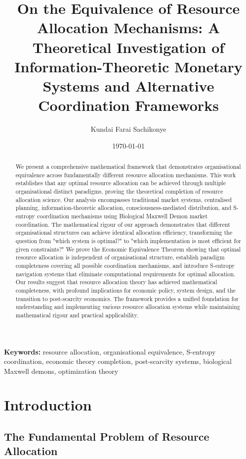 \documentclass[12pt,a4paper]{article}
\title{\textbf{On the Equivalence of Resource Allocation Mechanisms: A Theoretical Investigation of Information-Theoretic Monetary Systems and Alternative Coordination Frameworks}}
\author{Kundai Farai Sachikonye}
\date{\today}
\begin{document}
\maketitle

\begin{abstract}
We present a comprehensive mathematical framework that demonstrates organisational equivalence across fundamentally different resource allocation mechanisms. This work establishes that any optimal resource allocation can be achieved through multiple organisational distinct paradigms, proving the theoretical completion of resource allocation science. Our analysis encompasses traditional market systems, centralised planning, information-theoretic allocation, consciousness-mediated distribution, and S-entropy coordination mechanisms using Biological Maxwell Demon market coordination. The mathematical rigour of our approach demonstrates that different organisational structures can achieve identical allocation efficiency, transforming the question from "which system is optimal?" to "which implementation is most efficient for given constraints?" We prove the Economic Equivalence Theorem showing that optimal resource allocation is independent of organisational structure, establish paradigm completeness covering all possible coordination mechanisms, and introduce S-entropy navigation systems that eliminate computational requirements for optimal allocation. Our results suggest that resource allocation theory has achieved mathematical completeness, with profound implications for economic policy, system design, and the transition to post-scarcity economics. The framework provides a unified foundation for understanding and implementing various resource allocation systems while maintaining mathematical rigour and practical applicability.
\end{abstract}

\textbf{Keywords:} resource allocation, organisational equivalence, S-entropy coordination, economic theory completion, post-scarcity systems, biological Maxwell demons, optimization theory

\section{Introduction}

\subsection{The Fundamental Problem of Resource Allocation}
\end{document}
